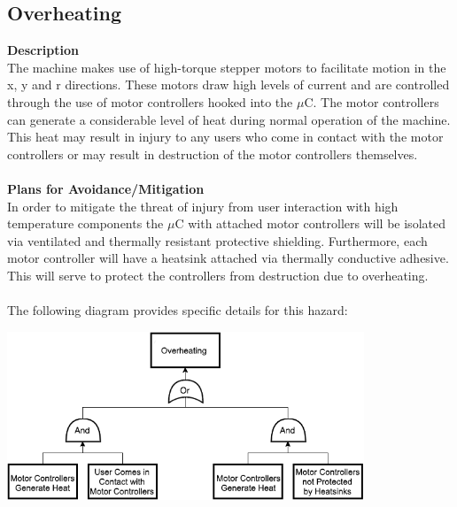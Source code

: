 \documentclass[titlepage]{article}
\begin{document}
\subsection{Overheating}
\textbf{Description}\\
The machine makes use of high-torque stepper motors to facilitate motion in the x, y and r directions. These motors draw high levels of current and are controlled through the use of motor controllers hooked into the $\mu$C. The motor controllers can generate a considerable level of heat during normal operation of the machine. This heat may result in injury to any users who come in contact with the motor controllers or may result in destruction of the motor controllers themselves.\\~\\
\textbf{Plans for Avoidance/Mitigation}\\
In order to mitigate the threat of injury from user interaction with high temperature components the $\mu$C with attached motor controllers will be isolated via ventilated and thermally resistant protective shielding. Furthermore, each motor controller will have a heatsink attached via thermally conductive adhesive. This will serve to protect the controllers from destruction due to overheating.\\~\\
The following diagram provides specific details for this hazard:
\begin{center}
	\includegraphics[width=0.8\textwidth]{OverheatingFTA.png}
\label{fig:yRailFig}
\end{center}

\newpage
\end{document}
